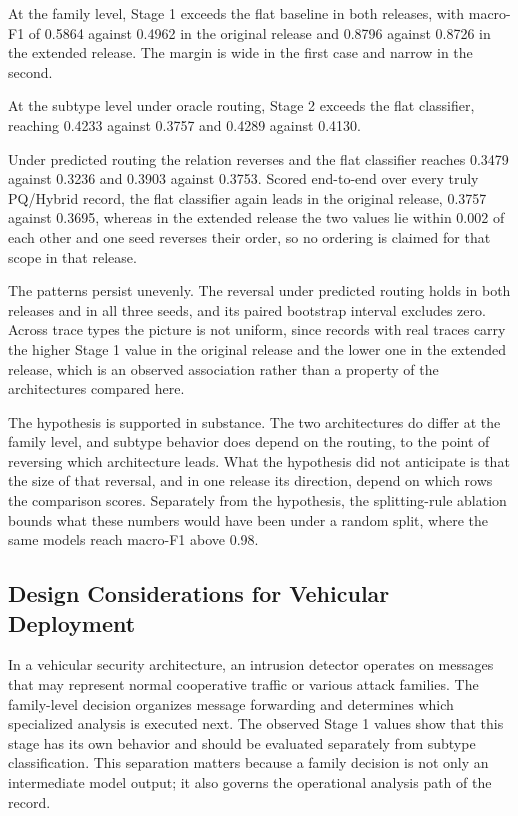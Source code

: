 \documentclass{IEEEoj}
\begin{document}
At the family level, Stage 1 exceeds the flat baseline in both releases, with
macro-F1 of 0.5864 against 0.4962 in the original release and 0.8796 against
0.8726 in the extended release. The margin is wide in the first case and
narrow in the second.

At the subtype level under oracle routing, Stage 2 exceeds the flat
classifier, reaching 0.4233 against 0.3757 and 0.4289 against 0.4130.

Under predicted routing the relation reverses and the flat classifier reaches
0.3479 against 0.3236 and 0.3903 against 0.3753. Scored end-to-end over every
truly PQ/Hybrid record, the flat classifier again leads in the original
release, 0.3757 against 0.3695, whereas in the extended release the two values
lie within 0.002 of each other and one seed reverses their order, so no
ordering is claimed for that scope in that release.

The patterns persist unevenly. The reversal under predicted routing holds in
both releases and in all three seeds, and its paired bootstrap interval
excludes zero. Across trace types the picture is not uniform, since records
with real traces carry the higher Stage 1 value in the original release and
the lower one in the extended release, which is an observed association rather
than a property of the architectures compared here.

The hypothesis is supported in substance. The two architectures do differ at
the family level, and subtype behavior does depend on the routing, to the
point of reversing which architecture leads. What the hypothesis did not
anticipate is that the size of that reversal, and in one release its
direction, depend on which rows the comparison scores. Separately from the
hypothesis, the splitting-rule ablation bounds what these numbers would have
been under a random split, where the same models reach macro-F1 above 0.98.

\subsection{Design Considerations for Vehicular Deployment}
In a vehicular security architecture, an intrusion detector operates on messages that may represent normal cooperative traffic or various attack families. The family-level decision organizes message forwarding and determines which specialized analysis is executed next. The observed Stage 1 values show that this stage has its own behavior and should be evaluated separately from subtype classification. This separation matters because a family decision is not only an intermediate model output; it also governs the operational analysis path of the record.
\end{document}
